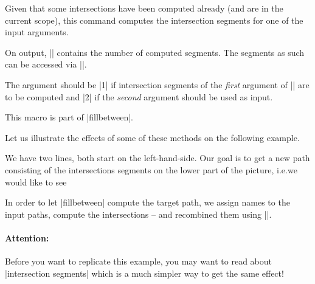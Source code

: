 \begin{command}{\pgfcomputeintersectionsegments{}}
    Given that some intersections have been computed already (and are in the
    current scope), this command computes the intersection segments for one of
    the input arguments.

    On output, |\pgfretval| contains the number of computed segments. The
    segments as such can be accessed via |\pgfgetintersectionsegmentpath|.

    The argument  should be |1| if intersection segments of the
    \emph{first} argument of |\pgfintersectionofpaths| are to be computed and
    |2| if the \emph{second} argument should be used as input.

    This macro is part of |fillbetween|.

    Let us illustrate the effects of some of these methods on the following
    example.
\begin{codeexample}[]
\end{codeexample}
    We have two lines, both start on the left-hand-side. Our goal is to get a
    new path consisting of the intersections segments on the lower part of the
    picture, i.e.\@ we would like to see
\begin{codeexample}[]
\end{codeexample}

    In order to let |fillbetween| compute the target path, we assign names to
    the input paths, compute the intersections -- and recombined them using
    |\pgfcomputeintersectionsegments|.


    \paragraph{Attention:}

    Before you want to replicate this example, you may want to read about
    |intersection segments| which is a much simpler way to get the same effect!
\begin{codeexample}[vbox]
\end{codeexample}
\end{command}

